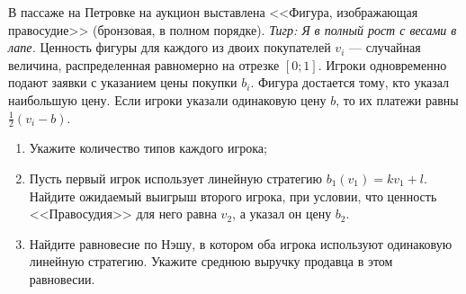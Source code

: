 \begin{problem}
В пассаже на Петровке на аукцион выставлена <<Фигура, изображающая правосудие>> (бронзовая, в полном порядке). {\it Тигр: Я в полный рост с весами в лапе.} Ценность фигуры для каждого из двоих покупателей  $v_{i} $  --- случайная величина, распределенная равномерно на отрезке  $\left[0;1\right]$. Игроки одновременно подают заявки с указанием цены покупки  $b_{i} $. Фигура достается тому, кто указал наибольшую цену. Если игроки указали одинаковую цену  $b$, то их платежи равны  $\frac{1}{2} \left(v_{i} -b\right)$.\par
\begin{enumerate}
\item	Укажите количество типов каждого игрока;\par
\item 	Пусть первый игрок использует линейную стратегию  $b_{1} \left(v_{1} \right)=kv_{1} +l$. Найдите ожидаемый выигрыш второго игрока, при условии, что ценность <<Правосудия>> для него равна  $v_{2} $, а указал он цену  $b_{2} $.\par
\item 	Найдите равновесие по Нэшу, в котором оба игрока используют одинаковую линейную стратегию. Укажите среднюю выручку продавца в этом равновесии.\par
\end{enumerate}


\begin{sol}

\end{sol}
\end{problem}




